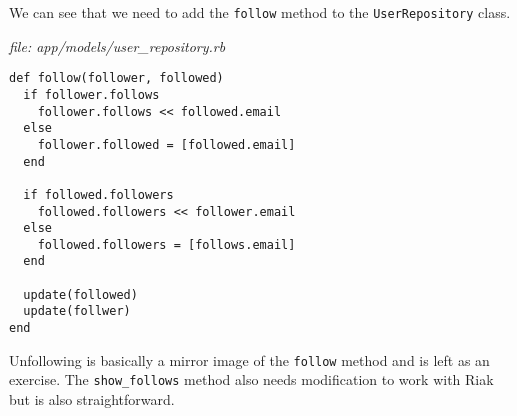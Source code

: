 \documentclass{article}
\begin{document}
We can see that we need to add the \texttt{follow} method to the \texttt{UserRepository} class.

\emph{file:  app/models/user\_repository.rb}

\begin{verbatim}
def follow(follower, followed)
  if follower.follows
    follower.follows << followed.email
  else
    follower.followed = [followed.email]
  end

  if followed.followers
    followed.followers << follower.email
  else
    followed.followers = [follows.email]
  end
  
  update(followed)
  update(follwer)
end

\end{verbatim}

Unfollowing is basically a mirror image of the \texttt{follow} method and is left as an exercise.  The \texttt{show\_follows} method also needs modification to work with Riak but is also straightforward.
\end{document}
